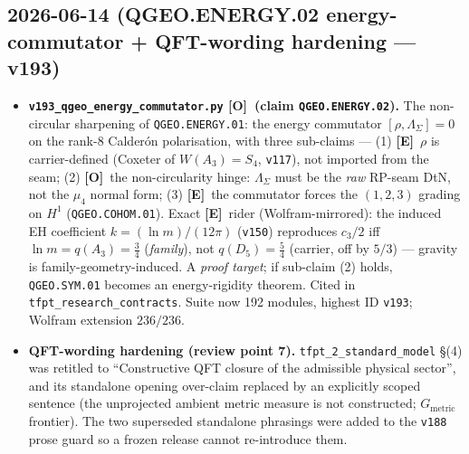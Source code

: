 \documentclass[11pt]{article}
\providecommand{\mE}{\textbf{[E]}}\providecommand{\mC}{\textbf{[C]}}
\providecommand{\mO}{\textbf{[O]}}\providecommand{\mX}{\textbf{[X]}}
\providecommand{\vref}[1]{\texttt{#1}}
\begin{document}
\subsection*{2026-06-14 (QGEO.ENERGY.02 energy-commutator + QFT-wording hardening --- v193)}
\begin{itemize}
\item \textbf{\texttt{v193\_qgeo\_energy\_commutator.py} \mO\ (claim \texttt{QGEO.ENERGY.02}).} The
  non-circular sharpening of \texttt{QGEO.ENERGY.01}: the energy commutator
  $[\rho,\Lambda_\Sigma]=0$ on the rank-$8$ Calder\'on polarisation, with three sub-claims --- (1) \mE\
  $\rho$ is carrier-defined (Coxeter of $W(A_3){=}S_4$, \vref{v117}), not imported from the seam; (2) \mO\
  the non-circularity hinge: $\Lambda_\Sigma$ must be the \emph{raw} RP-seam DtN, not the $\mu_4$ normal
  form; (3) \mE\ the commutator forces the $(1,2,3)$ grading on $H^1$ (\texttt{QGEO.COHOM.01}). Exact \mE\
  rider (Wolfram-mirrored): the induced EH coefficient $k=(\ln m)/(12\pi)$ (\vref{v150}) reproduces
  $c_3/2$ iff $\ln m=q(A_3)=\tfrac34$ (\emph{family}), not $q(D_5)=\tfrac54$ (carrier, off by $5/3$) ---
  gravity is family-geometry-induced. A \emph{proof target}; if sub-claim (2) holds, \texttt{QGEO.SYM.01}
  becomes an energy-rigidity theorem. Cited in \texttt{tfpt\_research\_contracts}. Suite now 192 modules,
  highest ID \texttt{v193}; Wolfram extension $236/236$.
\item \textbf{QFT-wording hardening (review point 7).} \texttt{tfpt\_2\_standard\_model} \S(4) was
  retitled to ``Constructive QFT closure of the admissible physical sector'', and its standalone
  opening over-claim replaced by an explicitly scoped sentence (the unprojected ambient metric measure is
  not constructed; $G_{\mathrm{metric}}$ frontier). The two superseded standalone phrasings were added to
  the \texttt{v188} prose guard so a frozen release cannot re-introduce them.
\end{itemize}
\end{document}
